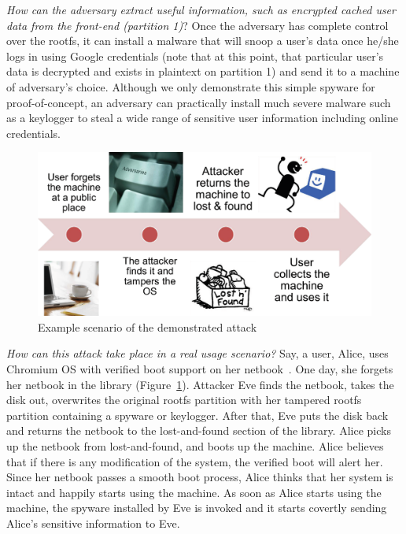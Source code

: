 \documentclass[11pt]{article}
\begin{document}
\textit{How can the adversary extract useful information, such as encrypted cached user data from the front-end (partition 1)}? Once the adversary has complete control over the rootfs, it can install a malware that will snoop a user's data once he/she logs in using Google credentials (note that at this point, that particular user's data is decrypted and exists in plaintext on partition 1) and send it to a machine of adversary's choice. Although we only demonstrate this simple spyware for proof-of-concept, an adversary can practically install much severe malware such as a keylogger to steal a wide range of sensitive user information including online credentials.
\begin{figure}[htbp]
  \centering
    \includegraphics[scale=0.3]{Figure/attack-example.eps}
\caption{\small{Example scenario of the demonstrated attack}}
\label{fig:attack-example}
\end{figure}


\textit{How can this attack take place in a real usage scenario?} Say, a user, Alice, uses Chromium OS with verified boot support on her netbook~\cite{netbook}. One day, she forgets her netbook in the library (Figure~\ref{fig:attack-example}). Attacker Eve finds the netbook, takes the disk out, overwrites the original rootfs partition with her tampered rootfs partition containing a spyware or keylogger. After that, Eve puts the disk back and returns the netbook to the lost-and-found section of the library. Alice picks up the netbook from lost-and-found, and boots up the machine. Alice believes that if there is any modification of the system, the verified boot will alert her. Since her netbook passes a smooth boot process, Alice thinks that her system is intact and happily starts using the machine. As soon as Alice starts using the machine, the spyware installed by Eve is invoked and it starts covertly sending Alice's sensitive information to Eve. 
\end{document}
